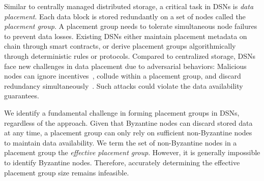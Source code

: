 Similar to centrally managed distributed storage, a critical task in DSNs is \emph{data placement}.
Each data block is stored redundantly on a set of nodes called the \emph{placement group}.
A placement group needs to tolerate simultaneous node failures to prevent data losses.
Existing DSNs either maintain placement metadata on chain through smart contracts, or derive placement groups algorithmically through deterministic rules or protocols.
Compared to centralized storage, DSNs face new challenges in data placement due to adversarial behaviors:
Malicious nodes can ignore incentives~\cite{bar}, collude within a placement group, and discard redundancy simultaneously~\cite{ipfs-attack,bittorrent-attack}.
Such attacks could violate the data availability guarantees.

We identify a fundamental challenge in forming placement groups in DSNs, regardless of the approach.
Given that Byzantine nodes can discard stored data at any time, a placement group can only rely on sufficient non-Byzantine nodes to maintain data availability.
We term the set of non-Byzantine nodes in a placement group the \emph{effective placement group}.
However, it is generally impossible to identify Byzantine nodes.
Therefore, accurately determining the effective placement group size remains infeasible.


